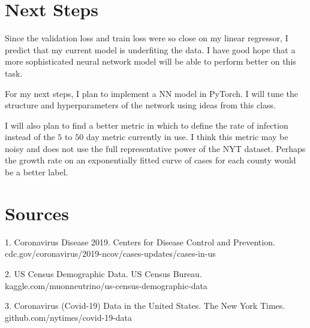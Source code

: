 \documentclass[12pt]{article}
\begin{document}
\section{Next Steps}

    Since the validation loss and train loss were so close on my linear regressor, I predict that my current model is underfiting the data. I have good hope that a more sophisticated neural network model will be able to perform better on this task.

    For my next steps, I plan to implement a NN model in PyTorch. I will tune the structure and hyperparameters of the network using ideas from this class.

    I will also plan to find a better metric in which to define the rate of infection instead of the $5$ to $50$ day metric currently in use. I think this metric may be noisy and does not use the full representative power of the NYT dataset. Perhaps the growth rate on an exponentially fitted curve of cases for each county would be a better label.

\section{Sources}

1. Coronavirus Disease 2019. Centers for Disease Control and Prevention. cdc.gov/coronavirus/2019-ncov/cases-updates/cases-in-us

2. US Census Demographic Data. US Census Bureau. kaggle.com/muonneutrino/us-census-demographic-data

3. Coronavirus (Covid-19) Data in the United States. The New York Times. github.com/nytimes/covid-19-data
\end{document}
